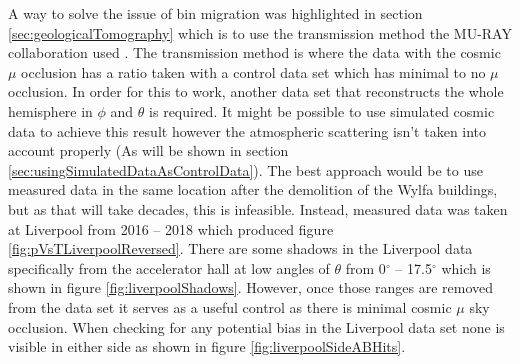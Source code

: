 A way to solve the issue of bin migration was highlighted in section \ref{sec:geologicalTomography} which is to use the transmission method the MU-RAY collaboration used \cite{Ambrosino_2014}. The transmission method is where the data with the cosmic $\mu$ occlusion has a ratio taken with a control data set which has minimal to no $\mu$ occlusion. In order for this to work, another data set that reconstructs the whole hemisphere in $\phi$ and $\theta$ is required. It might be possible to use simulated cosmic data to achieve this result however the atmospheric scattering isn't taken into account properly (As will be shown in section \ref{sec:usingSimulatedDataAsControlData}). The best approach would be to use measured data in the same location after the demolition of the Wylfa buildings, but as that will take decades, this is infeasible. Instead, measured data was taken at Liverpool from 2016 -- 2018 which produced figure \ref{fig:pVsTLiverpoolReversed}. There are some shadows in the Liverpool data specifically from the accelerator hall at low angles of $\theta$ from 0$^\circ$ -- 17.5$^\circ$ which is shown in figure \ref{fig:liverpoolShadows}. However, once those ranges are removed from the data set it serves as a useful control as there is minimal cosmic $\mu$ sky occlusion. When checking for any potential bias in the Liverpool data set none is visible in either side as shown in figure \ref{fig:liverpoolSideABHits}. 

